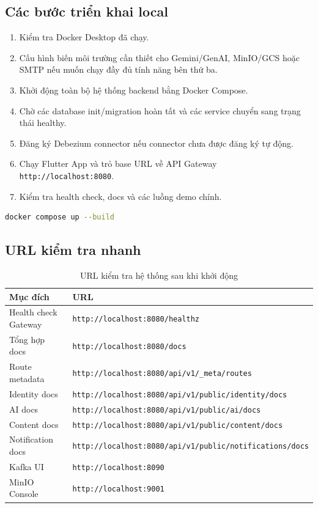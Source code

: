 \documentclass[14pt,a4paper,oneside]{extreport}
\begin{document}
\subsection{Các bước triển khai local}

\begin{enumerate}[leftmargin=2cm]
  \item Kiểm tra Docker Desktop đã chạy.
  \item Cấu hình biến môi trường cần thiết cho Gemini/GenAI, MinIO/GCS hoặc SMTP nếu muốn chạy đầy đủ tính năng bên thứ ba.
  \item Khởi động toàn bộ hệ thống backend bằng Docker Compose.
  \item Chờ các database init/migration hoàn tất và các service chuyển sang trạng thái healthy.
  \item Đăng ký Debezium connector nếu connector chưa được đăng ký tự động.
  \item Chạy Flutter App và trỏ base URL về API Gateway \texttt{http://localhost:8080}.
  \item Kiểm tra health check, docs và các luồng demo chính.
\end{enumerate}

\begin{lstlisting}[language=bash,caption={Lệnh chạy hệ thống local},label={lst:docker-compose-up}]
docker compose up --build
\end{lstlisting}

\subsection{URL kiểm tra nhanh}

\begin{table}[H]
\centering
\caption{URL kiểm tra hệ thống sau khi khởi động}
\label{tab:url-kiem-tra}
\renewcommand{\arraystretch}{1.3}
\small
\begin{tabularx}{\textwidth}{|l|X|}
\hline
\textbf{Mục đích} & \textbf{URL} \\
\hline
Health check Gateway & \texttt{http://localhost:8080/healthz} \\
\hline
Tổng hợp docs & \texttt{http://localhost:8080/docs} \\
\hline
Route metadata & \texttt{http://localhost:8080/api/v1/\_meta/routes} \\
\hline
Identity docs & \texttt{http://localhost:8080/api/v1/public/identity/docs} \\
\hline
AI docs & \texttt{http://localhost:8080/api/v1/public/ai/docs} \\
\hline
Content docs & \texttt{http://localhost:8080/api/v1/public/content/docs} \\
\hline
Notification docs & \texttt{http://localhost:8080/api/v1/public/notifications/docs} \\
\hline
Kafka UI & \texttt{http://localhost:8090} \\
\hline
MinIO Console & \texttt{http://localhost:9001} \\
\hline
\end{tabularx}
\end{table}
\end{document}
